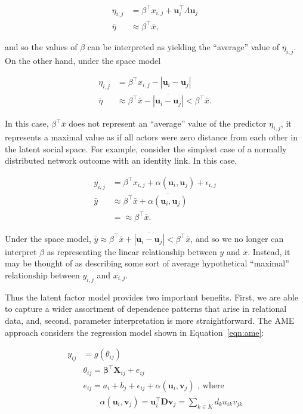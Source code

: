 \documentclass[9pt,twocolumn,twoside,lineno]{pnas-new}
\begin{document}
\begin{align*}
	\eta_{i,j} & =  \beta^\top x_{i,j} + \textbf{u}_{i}^{\top} \Lambda \textbf{u}_{j} \\
	\bar \eta & \approx  \beta^\top \bar x ,
\end{align*}

and so the values of $\beta$ can be interpreted as yielding the ``average'' value of $\eta_{i,j}$. On the other hand, under the space model

\begin{align*}
	\eta_{i,j} & =  \beta^\top x_{i,j} - |\textbf{u}_{i} - \textbf{u}_{j}|  \\
	\bar \eta & \approx  \beta^\top \bar x - \overline{ |\textbf{u}_{i} - \textbf{u}_{j}| } <  \beta^\top \bar x .
\end{align*}

In this case, $\beta^\top \bar x$ does not represent an ``average'' value of the predictor $\eta_{i,j}$, it represents a maximal value as if all actors were zero distance from each other in the latent social space. For example, consider the simplest case of a normally distributed network  outcome with an identity link. In this case,

\begin{align*}
	y_{i,j} & = \beta^\top x_{i,j} + \alpha(\textbf{u}_{i}, \textbf{u}_{j}) + \epsilon_{i,j} \\
	\bar y & \approx \beta^\top \bar x + \overline{ \alpha(\textbf{u}_{i}, \textbf{u}_{j}) }   \\
	& = \approx \beta^\top \bar x.
\end{align*}

Under the space model, $\bar y \approx \beta^\top \bar x + \overline{ |\textbf{u}_{i} - \textbf{u}_{j}|  } < \beta^\top \bar x$, and so we no longer can interpret $\beta$ as representing the linear relationship between $y$ and $x$. Instead, it may be thought of as describing some sort of average hypothetical ``maximal'' relationship between $y_{i,j}$ and $x_{i,j}$.

Thus the latent factor model provides two important benefits. First, we are able to capture a wider assortment of dependence patterns that arise in relational data, and, second, parameter interpretation is more straightforward. The AME approach considers the regression model shown in Equation~\ref{eqn:ame}:

\begin{align}
	y_{ij} &= g(\theta_{ij}) \\
	&\theta_{ij} = \bm\beta^{\top} \mathbf{X}_{ij} + e_{ij} \\
	&e_{ij} = a_{i} + b_{j}  + \epsilon_{ij} + \alpha(\textbf{u}_{i}, \textbf{v}_{j}) \text{  , where } \\
	&\qquad \alpha(\textbf{u}_{i}, \textbf{v}_{j}) = \textbf{u}_{i}^{\top} \textbf{D} \textbf{v}_{j} = \sum_{k \in K} d_{k} u_{ik} v_{jk} \\
\label{eqn:ame}
\end{align}
\end{document}

